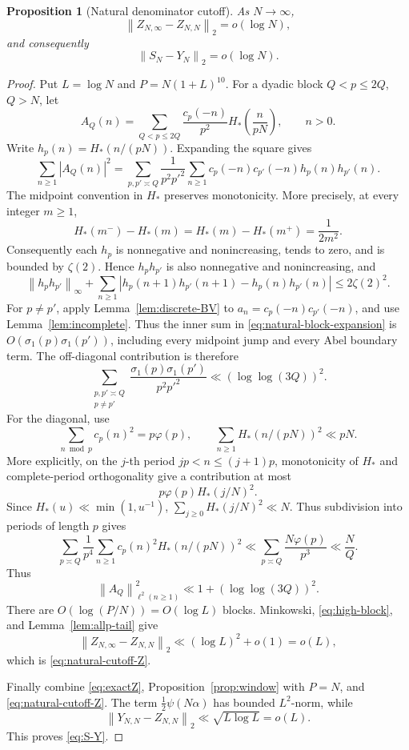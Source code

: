 \documentclass[11pt]{article}
\numberwithin{equation}{section}
\newtheorem{proposition}[theorem]{Proposition}
\theoremstyle{definition}
\newcommand{\1}{\mathbf 1}
\newcommand{\norm}[1]{\left\lVert#1\right\rVert}
\begin{document}
\begin{proposition}[Natural denominator cutoff]\label{prop:natural-cutoff}
As \(N\to\infty\),
\begin{equation}\label{eq:natural-cutoff-Z}
 \norm{Z_{N,\infty}-Z_{N,N}}_2=o(\log N),
\end{equation}
and consequently
\begin{equation}\label{eq:S-Y}
 \boxed{\norm{S_N-Y_N}_2=o(\log N).}
\end{equation}
\end{proposition}

\begin{proof}
Put \(L=\log N\) and \(P=N(1+L)^{10}\).  For a dyadic block
\(Q<p\le2Q\), \(Q>N\), let
\[
 A_Q(n)=\sum_{Q<p\le2Q}\frac{c_p(-n)}{p^2}
 H_*\left(\frac{n}{pN}\right),\qquad n>0.
\]
Write \(h_p(n)=H_*(n/(pN))\).  Expanding the square gives
\begin{equation}\label{eq:natural-block-expansion}
 \sum_{n\ge1}|A_Q(n)|^2
 =\sum_{p,p'\asymp Q}\frac1{p^2p'^2}
  \sum_{n\ge1}c_p(-n)c_{p'}(-n)h_p(n)h_{p'}(n).
\end{equation}
The midpoint convention in \(H_*\) preserves monotonicity.  More
precisely, at every integer \(m\ge1\),
\[
 H_*(m^-)-H_*(m)=H_*(m)-H_*(m^+)=\frac1{2m^2}.
\]
Consequently each \(h_p\) is nonnegative and nonincreasing, tends to
zero, and is bounded by \(\zeta(2)\).  Hence \(h_ph_{p'}\) is also
nonnegative and nonincreasing, and
\[
 \norm{h_ph_{p'}}_\infty+
 \sum_{n\ge1}|h_p(n+1)h_{p'}(n+1)-h_p(n)h_{p'}(n)|
 \le2\zeta(2)^2.
\]
For \(p\ne p'\), apply Lemma~\ref{lem:discrete-BV} to
\(a_n=c_p(-n)c_{p'}(-n)\), and use
Lemma~\ref{lem:incomplete}.  Thus the inner sum in
\eqref{eq:natural-block-expansion} is
\(O(\sigma_1(p)\sigma_1(p'))\), including every midpoint jump and
every Abel boundary term.  The off-diagonal contribution is therefore
\[
 \sum_{\substack{p,p'\asymp Q\\p\ne p'}}
 \frac{\sigma_1(p)\sigma_1(p')}{p^2p'^2}
 \ll(\log\log(3Q))^2.
\]
For the diagonal, use
\[
 \sum_{n\bmod p}c_p(n)^2=p\varphi(p),\qquad
 \sum_{n\ge1}H_*(n/(pN))^2\ll pN.
\]
More explicitly, on the \(j\)-th period \(jp<n\le(j+1)p\), monotonicity
of \(H_*\) and complete-period orthogonality give a contribution at most
\[
 p\varphi(p)H_*(j/N)^2.
\]
Since \(H_*(u)\ll\min(1,u^{-1})\),
\(\sum_{j\ge0}H_*(j/N)^2\ll N\).  Thus subdivision into periods of
length \(p\) gives
\[
 \sum_{p\asymp Q}\frac1{p^4}
 \sum_{n\ge1}c_p(n)^2H_*(n/(pN))^2
 \ll\sum_{p\asymp Q}\frac{N\varphi(p)}{p^3}
 \ll\frac NQ.
\]
Thus
\begin{equation}\label{eq:high-block}
 \norm{A_Q}_{\ell^2(n\ge1)}^2
 \ll1+(\log\log(3Q))^2.
\end{equation}
There are \(O(\log(P/N))=O(\log L)\) blocks.  Minkowski,
\eqref{eq:high-block}, and Lemma~\ref{lem:allp-tail} give
\[
 \norm{Z_{N,\infty}-Z_{N,N}}_2
 \ll(\log L)^2+o(1)=o(L),
\]
which is \eqref{eq:natural-cutoff-Z}.

Finally combine \eqref{eq:exactZ}, Proposition~\ref{prop:window} with
\(P=N\), and \eqref{eq:natural-cutoff-Z}.  The term
\(\frac12\psi(N\alpha)\) has bounded \(L^2\)-norm, while
\[
 \norm{Y_{N,N}-Z_{N,N}}_2
 \ll\sqrt{L\log L}=o(L).
\]
This proves \eqref{eq:S-Y}.
\end{proof}
\end{document}
